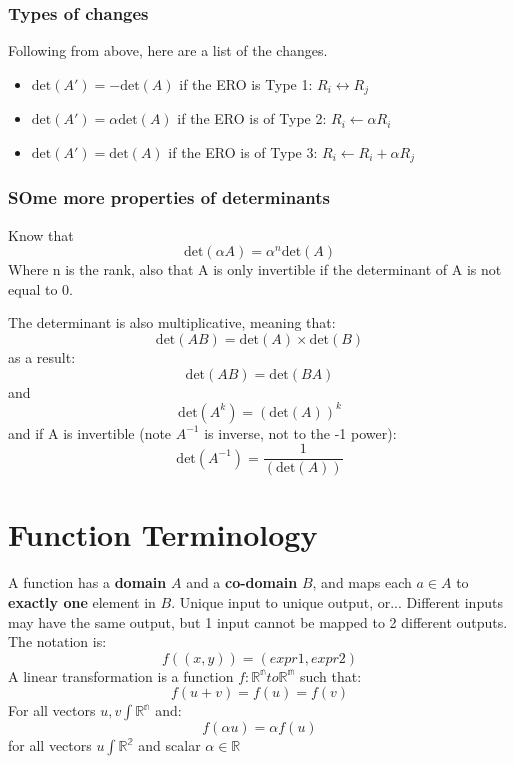 \documentclass[11pt]{book}
\begin{document}
{{\subsubsection{Types of changes}
\par{Following from above, here are a list of the changes. 
\begin{itemize}
	\item{$\mathrm{det}\left(A'\right)=-\mathrm{det}\left(A\right)$ if the ERO is Type 1: $R_{i}\leftrightarrow R_{j}$}
	\item{$\mathrm{det}\left(A'\right)=\alpha\mathrm{det}\left(A\right)$ if the ERO is of Type 2: $R_{i}\leftarrow\alpha R_{i}$}
	\item{$\mathrm{det}\left(A'\right)=\mathrm{det}\left(A\right)$ if the ERO is of Type 3: $R_{i}\leftarrow R_{i}+\alpha R_{j}$}
\end{itemize}}
\subsubsection{SOme more properties of determinants}
\par{Know that \[
\mathrm{det}\left(\alpha A\right)=\alpha^{n}\mathrm{det}\left(A\right)
\] Where n is the rank, also that A is only invertible if the determinant of A is not equal to 0.

The determinant is also multiplicative, meaning that: \[
\mathrm{det}\left(AB\right)=\mathrm{det}\left(A\right)\times\mathrm{det}\left(B\right)
\] as a result: \[
\mathrm{det}\left(AB\right)=\mathrm{det}\left(BA\right)
\] and \[
\mathrm{det}\left(A^{k}\right)=\left(\mathrm{det}\left(A\right)\right)^{k}
\] and if A is invertible (note $A^{-1}$ is inverse, not to the -1 power): \[
\mathrm{det}\left(A^{-1}\right)=\frac{1}{\left(\mathrm{det}\left(A\right)\right)}
\] 
}
\section{Function Terminology}
\par{A function has a \textbf{domain} $A$ and a \textbf{co-domain} $B$, and maps each $a\in A$ to  \textbf{exactly one} element in $B$. Unique input to unique output, or... Different inputs may have the same output, but 1 input cannot be mapped to 2 different outputs. The notation is: \[
f\left(\left(x,y\right)\right)=\left(expr1, expr2\right)
\] A linear transformation is a function $f:\mathbb{R^{n}}to\mathbb{R^{m}}$ such that: \[
f\left(u+v\right)=f\left(u\right)=f\left(v\right)
\] For all vectors $u,v\int\mathbb{R^{n}}$ 
and:
\[
f\left(\alpha u\right)=\alpha f\left(u\right)
\] for all vectors $u\int\mathbb{R^{2}}$ and scalar $\alpha\in\mathbb{R}$

}}}
\end{document}
